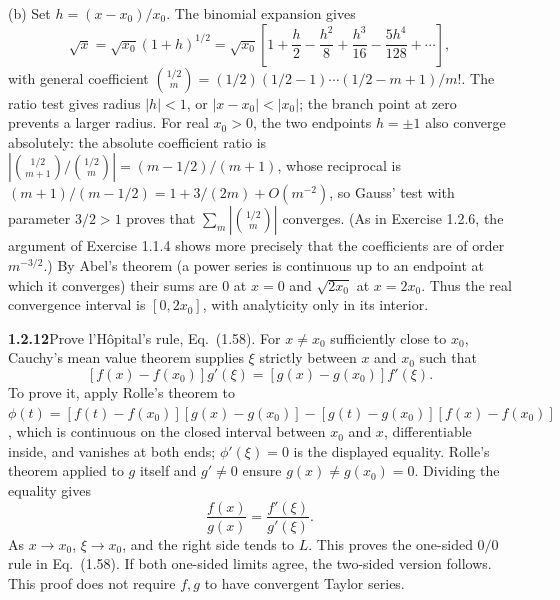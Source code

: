 (b) 
Set $h=(x-x_0)/x_0$. The binomial expansion gives
\[
 \sqrt x=\sqrt{x_0}(1+h)^{1/2}
 =\sqrt{x_0}\left[1+\frac h2-\frac{h^2}8+\frac{h^3}{16}
                   -\frac{5h^4}{128}+\cdots\right],
\]
with general coefficient
$\binom{1/2}{m}=(1/2)(1/2-1)\cdots(1/2-m+1)/m!$.
The ratio test gives radius $|h|<1$, or $|x-x_0|<|x_0|$;
the branch point at zero prevents a larger radius.
For real $x_0>0$, the two endpoints $h=\pm1$ also converge absolutely: the
absolute coefficient ratio is
$|\binom{1/2}{m+1}/\binom{1/2}{m}|=(m-1/2)/(m+1)$, whose reciprocal is
$(m+1)/(m-1/2)=1+3/(2m)+O(m^{-2})$, so Gauss' test with parameter
$3/2>1$ proves that $\sum_m|\binom{1/2}{m}|$ converges. (As in
Exercise 1.2.6, the argument of Exercise 1.1.4 shows more precisely
that the coefficients are of order $m^{-3/2}$.)
By Abel's theorem (a power series is continuous up to
an endpoint at which it converges) their sums are
$0$ at $x=0$ and $\sqrt{2x_0}$ at $x=2x_0$.
Thus the real convergence interval is $[0,2x_0]$, with analyticity
only in its interior.


\par\bigskip
\noindent\textbf{1.2.12}\quad Prove l'H\^opital's rule, Eq.~(1.58).
\solution
{}
For $x\ne x_0$ sufficiently close to $x_0$, Cauchy's mean value theorem
supplies $\xi$ strictly between $x$ and $x_0$ such that
\[
 [f(x)-f(x_0)]g'(\xi)=[g(x)-g(x_0)]f'(\xi).
\]
To prove it, apply Rolle's theorem to
$\phi(t)=[f(t)-f(x_0)][g(x)-g(x_0)]-[g(t)-g(x_0)][f(x)-f(x_0)]$,
which is continuous on the closed interval between $x_0$ and $x$,
differentiable inside, and vanishes at both ends; $\phi'(\xi)=0$ is the
displayed equality.
Rolle's theorem applied to $g$ itself and $g'\ne0$ ensure
$g(x)\ne g(x_0)=0$.
Dividing the equality gives
\[
 \frac{f(x)}{g(x)}=\frac{f'(\xi)}{g'(\xi)}.
\]
As $x\to x_0$, $\xi\to x_0$, and the right side tends to $L$.
This proves the one-sided $0/0$ rule in Eq.~(1.58). If both one-sided
limits agree, the two-sided version follows. This proof does not require
$f,g$ to have convergent Taylor series.


